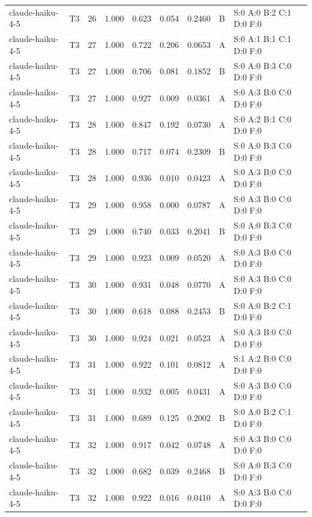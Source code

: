 \begin{longtable}{llrrrrrll}
claude-haiku-4-5 & T3 & 26 & 1.000 & 0.623 & 0.054 & 0.2460 & B & \tiny S:0 A:0 B:2 C:1 D:0 F:0 \\
claude-haiku-4-5 & T3 & 27 & 1.000 & 0.722 & 0.206 & 0.0653 & A & \tiny S:0 A:1 B:1 C:1 D:0 F:0 \\
claude-haiku-4-5 & T3 & 27 & 1.000 & 0.706 & 0.081 & 0.1852 & B & \tiny S:0 A:0 B:3 C:0 D:0 F:0 \\
claude-haiku-4-5 & T3 & 27 & 1.000 & 0.927 & 0.009 & 0.0361 & A & \tiny S:0 A:3 B:0 C:0 D:0 F:0 \\
claude-haiku-4-5 & T3 & 28 & 1.000 & 0.847 & 0.192 & 0.0730 & A & \tiny S:0 A:2 B:1 C:0 D:0 F:0 \\
claude-haiku-4-5 & T3 & 28 & 1.000 & 0.717 & 0.074 & 0.2309 & B & \tiny S:0 A:0 B:3 C:0 D:0 F:0 \\
claude-haiku-4-5 & T3 & 28 & 1.000 & 0.936 & 0.010 & 0.0423 & A & \tiny S:0 A:3 B:0 C:0 D:0 F:0 \\
claude-haiku-4-5 & T3 & 29 & 1.000 & 0.958 & 0.000 & 0.0787 & A & \tiny S:0 A:3 B:0 C:0 D:0 F:0 \\
claude-haiku-4-5 & T3 & 29 & 1.000 & 0.740 & 0.033 & 0.2041 & B & \tiny S:0 A:0 B:3 C:0 D:0 F:0 \\
claude-haiku-4-5 & T3 & 29 & 1.000 & 0.923 & 0.009 & 0.0520 & A & \tiny S:0 A:3 B:0 C:0 D:0 F:0 \\
claude-haiku-4-5 & T3 & 30 & 1.000 & 0.931 & 0.048 & 0.0770 & A & \tiny S:0 A:3 B:0 C:0 D:0 F:0 \\
claude-haiku-4-5 & T3 & 30 & 1.000 & 0.618 & 0.088 & 0.2453 & B & \tiny S:0 A:0 B:2 C:1 D:0 F:0 \\
claude-haiku-4-5 & T3 & 30 & 1.000 & 0.924 & 0.021 & 0.0523 & A & \tiny S:0 A:3 B:0 C:0 D:0 F:0 \\
claude-haiku-4-5 & T3 & 31 & 1.000 & 0.922 & 0.101 & 0.0812 & A & \tiny S:1 A:2 B:0 C:0 D:0 F:0 \\
claude-haiku-4-5 & T3 & 31 & 1.000 & 0.932 & 0.005 & 0.0431 & A & \tiny S:0 A:3 B:0 C:0 D:0 F:0 \\
claude-haiku-4-5 & T3 & 31 & 1.000 & 0.689 & 0.125 & 0.2002 & B & \tiny S:0 A:0 B:2 C:1 D:0 F:0 \\
claude-haiku-4-5 & T3 & 32 & 1.000 & 0.917 & 0.042 & 0.0748 & A & \tiny S:0 A:3 B:0 C:0 D:0 F:0 \\
claude-haiku-4-5 & T3 & 32 & 1.000 & 0.682 & 0.039 & 0.2468 & B & \tiny S:0 A:0 B:3 C:0 D:0 F:0 \\
claude-haiku-4-5 & T3 & 32 & 1.000 & 0.922 & 0.016 & 0.0410 & A & \tiny S:0 A:3 B:0 C:0 D:0 F:0 \\

\end{longtable}
